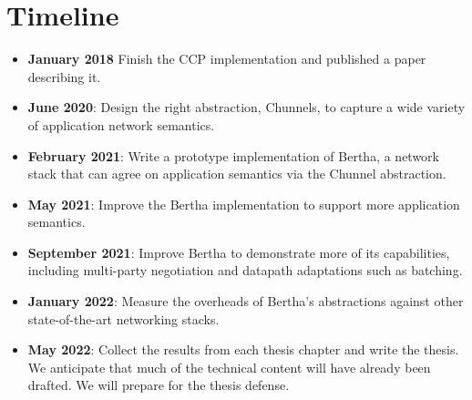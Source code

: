 \documentclass[fontsize=12pt,paper=letter]{scrartcl}
\newcommand{\tunnel}{Chunnel\xspace}
\newcommand{\tunnels}{Chunnels\xspace}
\begin{document}
\section{Timeline}

\begin{itemize}
    \item \textbf{January 2018} Finish the CCP implementation and published a paper describing it. 
    \item \textbf{June 2020}: Design the right abstraction, \tunnels, to capture a wide variety of application network semantics.
    \item \textbf{February 2021}: Write a prototype implementation of Bertha, a network stack that can agree on application semantics via the \tunnel abstraction.
    \item \textbf{May 2021}: Improve the Bertha implementation to support more application semantics.
    \item \textbf{September 2021}: Improve Bertha to demonstrate more of its capabilities, including multi-party negotiation and datapath adaptations such as batching. 
    \item \textbf{January 2022}: Measure the overheads of Bertha's abstractions against other state-of-the-art networking stacks. 
    \item \textbf{May 2022}: Collect the results from each thesis chapter and write the thesis. We anticipate that much of the technical content will have already been drafted. We will prepare for the thesis defense.
\end{itemize}


\begin{small}

\end{small}
\end{document}
